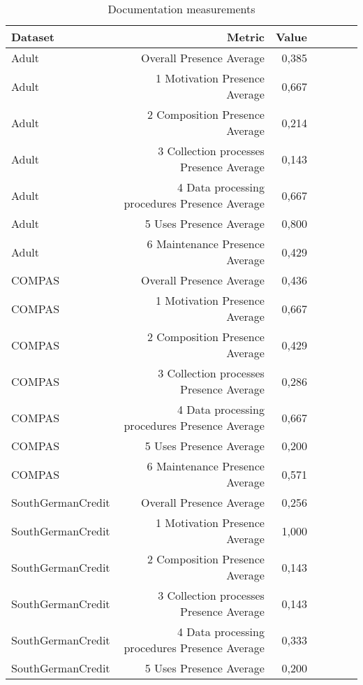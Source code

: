 \begin{table}[t]
\caption{Documentation measurements}
\label{tab:dts_all}
\begin{tabular}{|p{2cm}|r|r|r|r|r|r|}
\hline
Dataset & Metric & Value \\
\hline
Adult & Overall Presence Average & 0,385\cellcolor[HTML]{FDBBA8}\\
Adult & 1 Motivation Presence Average & 0,667\cellcolor[HTML]{FEDAD0}\\
Adult & 2 Composition Presence Average & 0,214\cellcolor[HTML]{FCA990}\\
Adult & 3 Collection processes Presence Average & 0,143\cellcolor[HTML]{FCA186}\\
Adult & 4 Data processing procedures Presence Average & 0,667\cellcolor[HTML]{FEDAD0}\\
Adult & 5 Uses Presence Average & 0,800\cellcolor[HTML]{FEE9E2}\\
Adult & 6 Maintenance Presence Average & 0,429\cellcolor[HTML]{FDC0AE}\\
COMPAS & Overall Presence Average & 0,436\cellcolor[HTML]{FDC1AF}\\
COMPAS & 1 Motivation Presence Average & 0,667\cellcolor[HTML]{FEDAD0}\\
COMPAS & 2 Composition Presence Average & 0,429\cellcolor[HTML]{FDC0AE}\\
COMPAS & 3 Collection processes Presence Average & 0,286\cellcolor[HTML]{FCB19A}\\
COMPAS & 4 Data processing procedures Presence Average & 0,667\cellcolor[HTML]{FEDAD0}\\
COMPAS & 5 Uses Presence Average & 0,200\cellcolor[HTML]{FCA78E}\\
COMPAS & 6 Maintenance Presence Average & 0,571\cellcolor[HTML]{FDD0C2}\\
SouthGermanCredit & Overall Presence Average & 0,256\cellcolor[HTML]{FCAD96}\\
SouthGermanCredit & 1 Motivation Presence Average & 1,000\cellcolor[HTML]{FFFFFF}\\
SouthGermanCredit & 2 Composition Presence Average & 0,143\cellcolor[HTML]{FCA186}\\
SouthGermanCredit & 3 Collection processes Presence Average & 0,143\cellcolor[HTML]{FCA186}\\
SouthGermanCredit & 4 Data processing procedures Presence Average & 0,333\cellcolor[HTML]{FCB6A0}\\
SouthGermanCredit & 5 Uses Presence Average & 0,200\cellcolor[HTML]{FCA78E}\\

\end{tabular}
\end{table}
